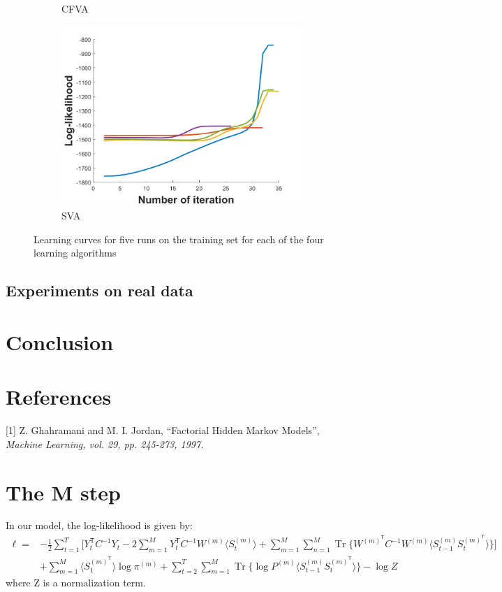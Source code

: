 \documentclass{article}
\DeclareMathOperator{\Tr}{Tr}
\begin{document}
\begin{figure}
\begin{subfigure}[b]{0.5\linewidth}
    \caption{CFVA} 
  \end{subfigure}%
  \begin{subfigure}[b]{0.5\linewidth}
    \centering
    \includegraphics[width=0.75\linewidth]{init_sva.png} 
    \caption{SVA} 
  \end{subfigure} 
  \caption{Learning curves for five runs on the training set for each of the four learning algorithms}
  \label{fig4} 
\end{figure}

\subsection{Experiments on real data}

\section{Conclusion}

\section*{References}

\small

[1] Z. Ghahramani and M. I. Jordan, ``Factorial Hidden Markov Models'', \it{Machine Learning}, vol. 29, pp. 245-273, 1997.

\normalsize

\appendix

\section{The M step}

In our model, the log-likelihood is given by:
\begin{align*}
\ell = &-\frac{1}{2} \sum_{t=1}^T \Bigg[Y_t^\mathsf{T} C^{-1} Y_t - 2 \sum_{m=1}^M Y_t^\mathsf{T} C^{-1} W^{(m)} \langle S_t^{(m)} \rangle + \sum_{m=1}^M \sum_{n=1}^M \Tr\bigg\{ W^{(m)^\mathsf{T}} C^{-1} W^{(m)} \langle S_{t-1}^{(m)} S_{t}^{(m)^\mathsf{T}} \rangle \bigg\} \Bigg] \\
&+ \sum_{m=1}^M \langle S_1^{(m)^\mathsf{T}} \rangle \log \pi^{(m)} + \sum_{t=2}^T \sum_{m=1}^M \Tr\Big\{ \log P^{(m)} \langle S_{t-1}^{(m)} S_{t}^{(m)^\mathsf{T}} \rangle \Big\} - \log Z
\end{align*} 
where Z is a normalization term.
\end{document}
